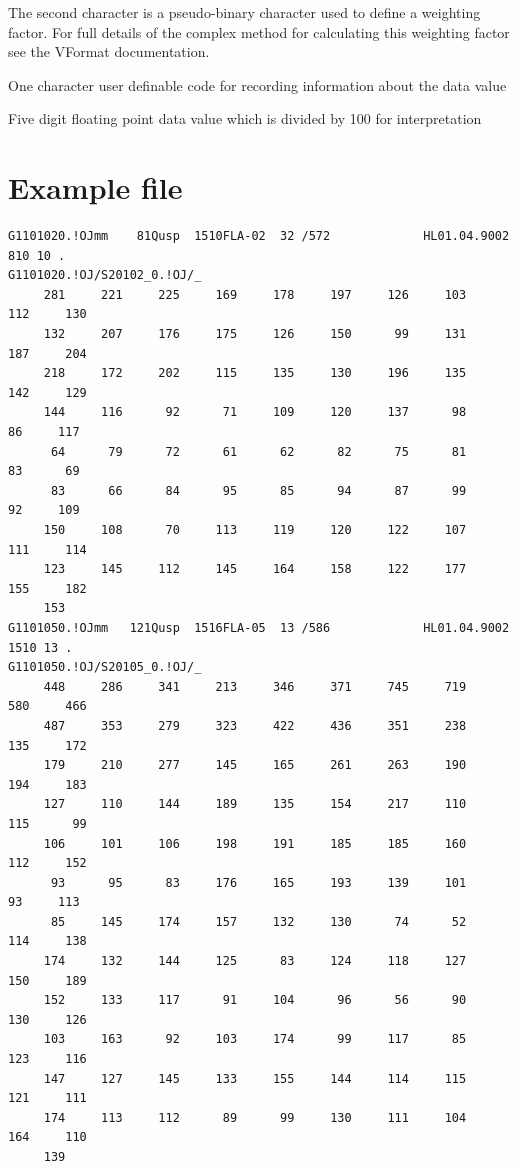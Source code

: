 The second character is a pseudo-binary character used to define a weighting factor.  For full details of the complex method for calculating this weighting factor see the VFormat documentation.

\begin{itemize*}
 \item One character user definable code for recording information about the data value 
 \item Five digit floating point data value which is divided by 100 for interpretation 
\end{itemize*}

\section{Example file}
\begin{lstlisting}
G1101020.!OJmm    81Qusp  1510FLA-02  32 /572             HL01.04.9002  810 10 .
G1101020.!OJ/S20102_0.!OJ/_                                                     
     281     221     225     169     178     197     126     103     112     130
     132     207     176     175     126     150      99     131     187     204
     218     172     202     115     135     130     196     135     142     129
     144     116      92      71     109     120     137      98      86     117
      64      79      72      61      62      82      75      81      83      69
      83      66      84      95      85      94      87      99      92     109
     150     108      70     113     119     120     122     107     111     114
     123     145     112     145     164     158     122     177     155     182
     153
G1101050.!OJmm   121Qusp  1516FLA-05  13 /586             HL01.04.9002 1510 13 .
G1101050.!OJ/S20105_0.!OJ/_                                                     
     448     286     341     213     346     371     745     719     580     466
     487     353     279     323     422     436     351     238     135     172
     179     210     277     145     165     261     263     190     194     183
     127     110     144     189     135     154     217     110     115      99
     106     101     106     198     191     185     185     160     112     152
      93      95      83     176     165     193     139     101      93     113
      85     145     174     157     132     130      74      52     114     138
     174     132     144     125      83     124     118     127     150     189
     152     133     117      91     104      96      56      90     130     126
     103     163      92     103     174      99     117      85     123     116
     147     127     145     133     155     144     114     115     121     111
     174     113     112      89      99     130     111     104     164     110
     139
\end{lstlisting}


